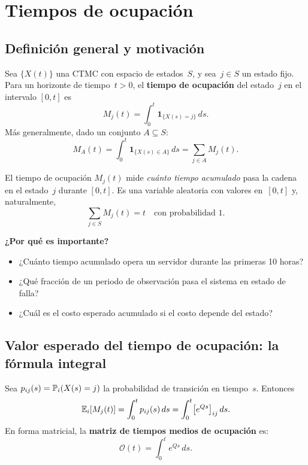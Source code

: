 \documentclass[11pt, letterpaper]{article}
\begin{document}
\section{Tiempos de ocupación}

\subsection{Definición general y motivación}

\begin{definicionbox}
  Sea $\{X(t)\}$ una CTMC con espacio de estados~$S$, y sea~$j\in S$
  un estado fijo.  Para un horizonte de tiempo~$t>0$, el
  \textbf{tiempo de ocupación} del estado~$j$ en el intervalo
  $[0,t]$ es
  \[
    M_j(t) = \int_0^t \mathbf{1}_{\{X(s)=j\}}\,ds.
  \]
  Más generalmente, dado un conjunto $A\subseteq S$:
  \[
    M_A(t) = \int_0^t \mathbf{1}_{\{X(s)\in A\}}\,ds
            = \sum_{j\in A} M_j(t).
  \]
\end{definicionbox}

El tiempo de ocupación $M_j(t)$ mide \emph{cuánto tiempo acumulado}
pasa la cadena en el estado~$j$ durante $[0,t]$.  Es una variable
aleatoria con valores en~$[0,t]$ y, naturalmente,
\[
  \sum_{j\in S} M_j(t) = t \quad\text{con probabilidad 1.}
\]

\textbf{¿Por qué es importante?}
\begin{itemize}
  \item ¿Cuánto tiempo acumulado opera un servidor durante las
        primeras 10 horas?
  \item ¿Qué fracción de un periodo de observación pasa el sistema
        en estado de falla?
  \item ¿Cuál es el costo esperado acumulado si el costo depende
        del estado?
\end{itemize}

\subsection{Valor esperado del tiempo de ocupación: la fórmula integral}

\begin{metodobox}
  Sea $p_{ij}(s) = \mathbb{P}_i(X(s)=j)$ la probabilidad de transición en
  tiempo~$s$.  Entonces
  \begin{equation}\label{eq:occ_esperanza}
    \mathbb{E}_i[M_j(t)] = \int_0^t p_{ij}(s)\,ds
    = \int_0^t \bigl[e^{Qs}\bigr]_{ij}\,ds.
  \end{equation}
  En forma matricial, la \textbf{matriz de tiempos medios de
  ocupación} es:
  \begin{equation}\label{eq:occ_matricial}
    \mathcal{O}(t) = \int_0^t e^{Qs}\,ds.
  \end{equation}
\end{metodobox}
\end{document}

